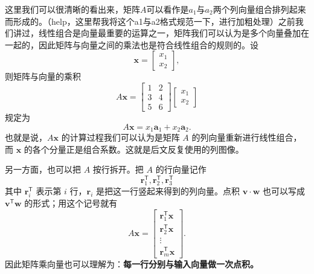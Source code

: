 \documentclass[UTF8,a4paper,12pt]{ctexart}
\numberwithin{equation}{section}
\newcommand{\trans}{^{\mathsf T}}
\begin{document}
	这里我们可以很清晰的看出来，矩阵$A$可以看作是$a_1$与$a_2$两个列向量组合排列起来而形成的。（help，这里帮我将这个a1与a2格式规范一下，进行加粗处理）之前我们讲过，线性组合是向量最重要的运算之一，矩阵我们可以认为是多个向量叠加在一起的，因此矩阵与向量之间的乘法也是符合线性组合的规则的。设
	\begin{equation}\label{eq:3.5}
	\bm{x}=
	\begin{bmatrix}
		x_1\\x_2
	\end{bmatrix},
	\end{equation}
	则矩阵与向量的乘积
	\begin{equation}\label{eq:3.6}
	A\bm{x}
	=
	\begin{bmatrix}
		1&2\\
		3&4\\
		5&6
	\end{bmatrix}
	\begin{bmatrix}
		x_1\\x_2
	\end{bmatrix}
	\end{equation}
	规定为
	\begin{equation}\label{eq:3.7}
	\boxed{A\bm{x}=x_1\bm{a}_1+x_2\bm{a}_2.}
	\end{equation}
	也就是说，$A\bm{x}$ 的计算过程我们可以认为是矩阵 $A$ 的列向量重新进行线性组合，而 $\bm{x}$ 的各个分量正是组合系数。这就是后文反复使用的列图像。
	
	另一方面，也可以把 $A$ 按行拆开。把 $A$ 的行向量记作
	\begin{equation}\label{eq:3.8}
	\bm{r}_1\trans,\bm{r}_2\trans,\bm{r}_3\trans
	\end{equation}
	其中 $\bm{r}_i\trans$ 表示第 $i$ 行，$\bm{r}_i$ 是把这一行竖起来得到的列向量。点积 $\bm{v}\cdot\bm{w}$ 也可以写成 $\bm{v}\trans\bm{w}$ 的形式；用这个记号就有
	\begin{equation}\label{eq:3.9}
	A\bm{x}
	=
	\begin{bmatrix}
		\bm{r}_1\trans\bm{x}\\
		\bm{r}_2\trans\bm{x}\\
		\vdots\\
		\bm{r}_m\trans\bm{x}
	\end{bmatrix}.
	\end{equation}
	因此矩阵乘向量也可以理解为：\textbf{每一行分别与输入向量做一次点积。}
	
\end{document}
